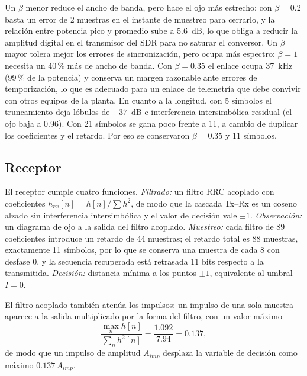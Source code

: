 Un $\beta$ menor reduce el ancho de banda, pero hace el ojo más estrecho: con $\beta=0.2$ basta un error de 2 muestras en el instante de muestreo para cerrarlo, y la relación entre potencia pico y promedio sube a 5.6~dB, lo que obliga a reducir la amplitud digital en el transmisor del SDR para no saturar el conversor. Un $\beta$ mayor tolera mejor los errores de sincronización, pero ocupa más espectro: $\beta=1$ necesita un 40\,\% más de ancho de banda. Con $\beta=0.35$ el enlace ocupa 37~kHz (99\,\% de la potencia) y conserva un margen razonable ante errores de temporización, lo que es adecuado para un enlace de telemetría que debe convivir con otros equipos de la planta. En cuanto a la longitud, con 5 símbolos el truncamiento deja lóbulos de $-37$~dB e interferencia intersimbólica residual (el ojo baja a 0.96). Con 21 símbolos se gana poco frente a 11, a cambio de duplicar los coeficientes y el retardo. Por eso se conservaron $\beta=0.35$ y 11 símbolos.

\subsection{Receptor}
El receptor cumple cuatro funciones. \emph{Filtrado:} un filtro RRC acoplado con coeficientes $h_{rx}[n]=h[n]/\sum h^2$, de modo que la cascada Tx--Rx es un coseno alzado sin interferencia intersimbólica y el valor de decisión vale $\pm1$. \emph{Observación:} un diagrama de ojo a la salida del filtro acoplado. \emph{Muestreo:} cada filtro de 89 coeficientes introduce un retardo de 44 muestras; el retardo total es 88 muestras, exactamente 11 símbolos, por lo que se conserva una muestra de cada 8 con desfase 0, y la secuencia recuperada está retrasada 11 bits respecto a la transmitida. \emph{Decisión:} distancia mínima a los puntos $\pm1$, equivalente al umbral $I=0$.

El filtro acoplado también atenúa los impulsos: un impulso de una sola muestra aparece a la salida multiplicado por la forma del filtro, con un valor máximo
\begin{equation}
    \frac{\max_n h[n]}{\sum_n h^2[n]} = \frac{1.092}{7.94} = 0.137,
    \label{eq:atenuacion}
\end{equation}
de modo que un impulso de amplitud $A_{imp}$ desplaza la variable de decisión como máximo $0.137\,A_{imp}$.

